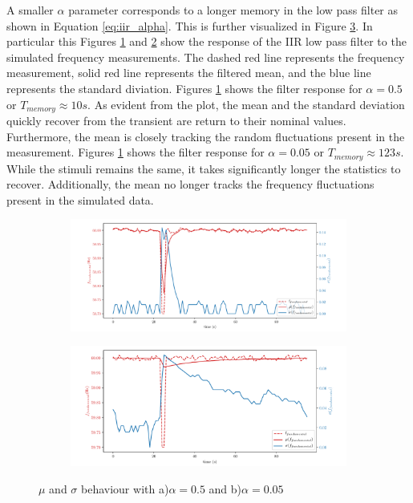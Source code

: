 A smaller $\alpha$ parameter corresponds to a longer memory in the low pass filter as shown in Equation \ref{eq:iir_alpha}.
This is further visualized in Figure \ref{fig:expdes:5}.
In particular this Figures \ref{fig:expdes:5:1} and \ref{fig:expdes:5:2} show the response of the IIR low pass filter to the simulated frequency measurements.
The dashed red line represents the frequency measurement, solid red line represents the filtered mean, and the blue line represents the standard diviation.
Figures \ref{fig:expdes:5:1} shows the filter response for $\alpha = 0.5$ or $T_{memory} \approx 10s $.
As evident from the plot, the mean and the standard deviation quickly recover from the transient are return to their nominal values.
Furthermore, the mean is closely tracking the random fluctuations present in the measurement.
Figures \ref{fig:expdes:5:1} shows the filter response for $\alpha = 0.05$ or $T_{memory} \approx 123s $.
While the stimuli remains the same, it takes significantly longer the statistics to recover.
Additionally, the mean no longer tracks the frequency fluctuations present in the simulated data.
\begin{figure}[ht!]
    \centering
    \begin{subfigure}{0.9\textwidth}
        \centering
        \includegraphics[width=1\linewidth]{img/napali_eval/Napali_response_freq_05.pdf}
        \caption{}
        \label{fig:expdes:5:1}
    \end{subfigure}%

    \begin{subfigure}{0.9\textwidth}
        \centering
        \includegraphics[width=1\linewidth]{img/napali_eval/Napali_response_freq_005.pdf}
        \caption{}
        \label{fig:expdes:5:2}
    \end{subfigure}
    \caption{$\mu$ and $\sigma$ behaviour with a)$\alpha = 0.5$ and b)$\alpha=0.05$}
    \label{fig:expdes:5}
\end{figure}


